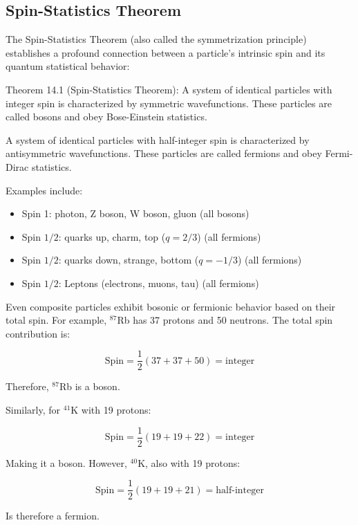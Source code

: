 \documentclass[italian]{HKNdocument}
\begin{document}
\subsection{Spin-Statistics Theorem}
The Spin-Statistics Theorem (also called the symmetrization principle) establishes a profound connection between a particle's intrinsic spin and its quantum statistical behavior:

Theorem 14.1 (Spin-Statistics Theorem): A system of identical particles with integer spin is characterized by symmetric wavefunctions. These particles are called bosons and obey Bose-Einstein statistics.

A system of identical particles with half-integer spin is characterized by antisymmetric wavefunctions. These particles are called fermions and obey Fermi-Dirac statistics.

Examples include:
\begin{itemize}
  \item Spin 1: photon, Z boson, W boson, gluon (all bosons)
  \item Spin $1/2$: quarks up, charm, top ($q=2/3$) (all fermions)
  \item Spin $1/2$: quarks down, strange, bottom ($q=-1/3$) (all fermions)
  \item Spin $1/2$: Leptons (electrons, muons, tau) (all fermions)
\end{itemize}

Even composite particles exhibit bosonic or fermionic behavior based on their total spin. For example, $^{87}$Rb has 37 protons and 50 neutrons. The total spin contribution is:

\begin{equation}
\text{Spin}=\frac{1}{2}(37+37+50)=\text{integer}
\end{equation}

Therefore, $^{87}$Rb is a boson.

Similarly, for $^{41}$K with 19 protons:

\begin{equation}
\text{Spin}=\frac{1}{2}(19+19+22)=\text{integer}
\end{equation}

Making it a boson. However, $^{40}$K, also with 19 protons:

\begin{equation}
\text{Spin}=\frac{1}{2}(19+19+21)=\text{half-integer}
\end{equation}

Is therefore a fermion.
\end{document}
